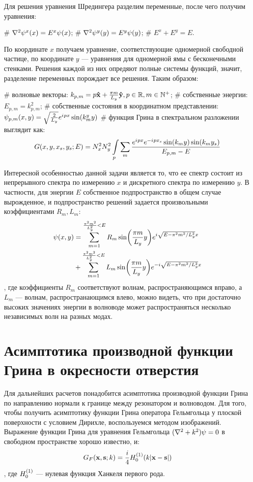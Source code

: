 Для решения уравнения Шредингера разделим переменные, после чего получим уравнения:
\begin{ilist}
# $\laplacian \psi^x(x) = E^x \psi(x)$;
# $\laplacian \psi^y(y) = E^y \psi(y)$;
# $E^x + E^y = E$.
\end{ilist}
По координате $x$ получаем уравнение, соответствующие одномерной свободной частице, по координате $y$ — уравнения для одномерной ямы с бесконечными стенками. Решения каждой из них опредяют полные системы функций, значит, разделение переменных порождает все решения. Таким образом:
\begin{ilist}
# волновые векторы: $k_{p, m} = p \vb{\hat{x}} + \frac{\pi m}{L_y} \vb{\hat{y}}, p \in \mathbb{R}, m \in \mathbb{N}^+$;
# собственные энергии: $E_{p, m} = k_{p, m}^2$;
# собственные состояния в координатном представлении: $\psi_{p, m}(x, y) = \sqrt{\frac{2}{L_y}} e^{{i\mkern1mu} p x} \sin(k^y_m y)$
# функция Грина в спектральном разложении выглядит как: 
\[
G(x, y, x_s, y_s; E) = N_x^2 N_y^2 \int\limits_p \sum\limits_m \frac{e^{{i\mkern1mu} p x} e^{-{i\mkern1mu} p x_s} \sin(k_m y) \sin(k_m y_s)}{E_{p, m} - E}
\]
\end{ilist}
Интересной особенностью данной задачи является то, что ее спектр состоит из непрерывного спектра по измерению $x$ и дискретного спектра по измерению $y$. В частности, для энергии $E$ собственное подпространство в общем случае вырожденное, и подпространство решений задается произвольными коэффициентами $R_m, L_m$:
\begin{align*}
\psi(x, y)
& = \sum\limits_{m = 1}^{\frac{\pi^2 m^2}{L_y^2} < E} R_m \sin(\frac{\pi m}{L_y} y) e^{{i\mkern1mu} \sqrt{E - \pi^2 m^2 / L_y^2} x} \\
& + \sum\limits_{m = 1}^{\frac{\pi^2 m^2}{L_y^2} < E} L_m \sin(\frac{\pi m}{L_y} y) e^{-{i\mkern1mu} \sqrt{E - \pi^2 m^2 / L_y^2} x}
\end{align*}
, где коэффициенты $R_m$ соответствуют волнам, распространяющимся вправо, а $L_m$ — волнам, распространающимся влево, можно видеть, что при достаточно высоких значениях энергии в волноводе может распространяться несколько независимых волн на разных модах.

\section{Асимптотика производной функции Грина в окресности отверстия}
Для дальнейших расчетов понадобится асимптотика производной функции Грина по направлению нормали к границе между резонатором и волноводом. Для того, чтобы получить асимптотику функции Грина оператора Гельмгольца у плоской поверхности с условием Дирихле, воспользуемся методом изображений. Выражение функции Грина для уравнения Гельмгольца $(\laplacian + k^2) \psi = 0$ в свободном пространстве хорошо известно, и:
\[
G_F(\vb{x}, \vb{s}; k) = \frac{i}{4} H_{0}^{(1)}(k |\vb{x} - \vb{s}|)
\],
где $H_{0}^{(1)}$ — нулевая функция Ханкеля первого рода\cite{hankel_first_kind}.

